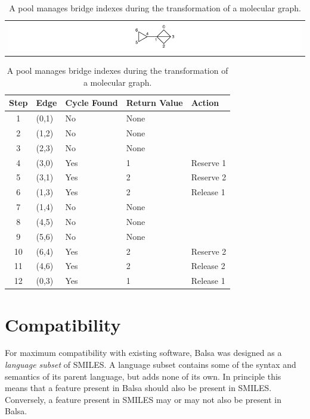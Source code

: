 \documentclass{article}
\begin{document}
\begin{table}
    \caption{A pool manages bridge indexes during the transformation of a molecular graph.}
    \centering
    \begin{tabular}{c}
        \includegraphics[width=\columnwidth]{pool.pdf}
    \end{tabular}

    \bigskip

    \begin{tabular}{c l l l l}
        \hline
        Step & Edge  & Cycle Found & Return Value & Action    \\
        \hline
        1    & (0,1) & No  & None         &           \\
        2    & (1,2) & No  & None         &           \\
        3    & (2,3) & No  & None         &           \\
        4    & (3,0) & Yes & 1            & Reserve 1 \\
        5    & (3,1) & Yes & 2            & Reserve 2 \\
        6    & (1,3) & Yes & 2            & Release 1 \\
        7    & (1,4) & No  & None         &           \\
        8    & (4,5) & No  & None         &           \\
        9    & (5,6) & No  & None         &           \\
        10   & (6,4) & Yes & 2            & Reserve 2 \\
        11   & (4,6) & Yes & 2            & Release 2 \\
        12   & (0,3) & Yes & 1            & Release 1 \\
        \hline
    \end{tabular}
    \label{table:pool}
\end{table}

\section*{Compatibility}

For maximum compatibility with existing software, Balsa was designed as a \textit{language subset} of SMILES. A language subset contains some of the syntax and semantics of its parent language, but adds none of its own. In principle this means that a feature present in Balsa should also be present in SMILES. Conversely, a feature present in SMILES may or may not also be present in Balsa.
\end{document}
